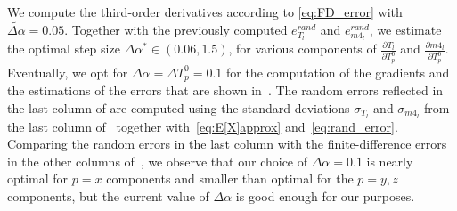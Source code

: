 \documentclass[times,final,nopreprintline]{elsarticle}
\begin{document}
We compute the third-order derivatives according to \eqref{eq:FD_error} with $\widetilde{\Delta \alpha}=0.05$. Together with the previously computed $e^{rand}_{T_l}$ and $e^{rand}_{m4_l}$, we estimate the optimal step size $\Delta \alpha^*\in (0.06,1.5)$, for various components of $\frac{\partial T_l}{\partial T_p^0}$ and $\frac{\partial m4_l}{\partial T_p^0}$. Eventually, we opt for $\Delta \alpha=\Delta T_p^0=0.1$ for the computation of the gradients and the estimations of the errors that are shown in~. 
The random errors reflected in the last column of  are computed using the standard deviations $\sigma_{T_l}$ and $\sigma_{m4_l}$  from the last column of~ together with~\eqref{eq:E[X]approx} and~\eqref{eq:rand_error}. 
Comparing the random errors in the last column with the finite-difference errors in the other columns of~, we observe that our choice of $\Delta \alpha=0.1$ is nearly optimal for $p=x$ components and smaller than optimal for the $p=y,z$ components, but the current value of $\Delta \alpha$ is good enough for our purposes.
\end{document}
